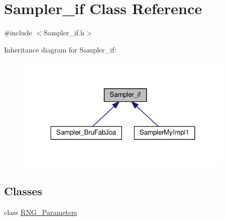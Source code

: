 \hypertarget{class_sampler__if}{\section{Sampler\-\_\-if Class Reference}
\label{class_sampler__if}
}


{\ttfamily \#include $<$Sampler\-\_\-if.\-h$>$}



Inheritance diagram for Sampler\-\_\-if\-:\nopagebreak
\begin{figure}[H]
\begin{center}
\leavevmode
\includegraphics[width=293pt]{class_sampler__if__inherit__graph}
\end{center}
\end{figure}
\subsection*{Classes}
\begin{DoxyCompactItemize}
\item 
class \hyperlink{class_sampler__if_1_1_r_n_g___parameters}{R\-N\-G\-\_\-\-Parameters}
\end{DoxyCompactItemize}
